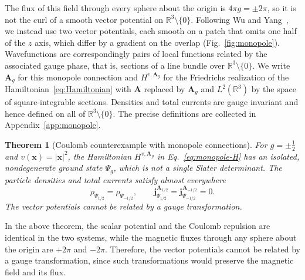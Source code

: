\documentclass[11pt,a4paper]{article}
\newtheorem{theorem}{Theorem}[section]
\theoremstyle{remark}
\theoremstyle{plain}
\newcommand{\R}{\mathbb R}
\newcommand{\jj}{\mathbf j}
\newcommand{\A}{\mathbf A}
\begin{document}
The flux of this field through every sphere about the origin
is $4\pi g=\pm2\pi$, so it is not the curl of a smooth vector potential
on $\R^3\setminus\{0\}$. Following Wu and Yang~\cite{WuYang1976}, we
instead use two vector potentials, each smooth on a patch that omits
one half of the $z$ axis, which differ by a gradient on the overlap
(Fig.~\ref{fig:monopole}). Wavefunctions are correspondingly pairs of
local functions related by the associated gauge phase, that is,
sections of a line bundle over $\R^3\setminus\{0\}$. We write $\A_g$
for this monopole connection and $H^{v,\A_g}$ for the Friedrichs
realization of the Hamiltonian~\eqref{eq:Hamiltonian} with $\A$
replaced by $\A_g$ and $L^2(\R^3)$ by the space of square-integrable
sections. Densities and total currents are gauge invariant and hence
defined on all of $\R^3\setminus\{0\}$. The precise definitions are
collected in Appendix~\ref{app:monopole}.

\begin{theorem}[Coulomb counterexample with monopole connections]
\label{thm:monopole}
For $g=\pm\tfrac12$ and $v(\mathbf x)=|\mathbf x|^2$, the Hamiltonian $H^{v,\A_g}$ in
Eq.~\eqref{eq:monopole-H} has an isolated, nondegenerate ground state
$\Psi_g$, which is not a single Slater determinant. The particle densities and total currents satisfy 
almost everywhere
\begin{equation}
 \rho_{\Psi_{1/2}}=\rho_{\Psi_{-1/2}},\qquad
 \jj_{\Psi_{1/2}}^{\A_{1/2}}=\jj_{\Psi_{-1/2}}^{\A_{-1/2}}=0.
 \label{eq:monopole-coincidence}
\end{equation}
The vector potentials cannot be related by a gauge transformation.
\end{theorem}


In the above theorem, the scalar potential and the Coulomb 
repulsion are identical in the
two systems, while the magnetic fluxes through any sphere about the
origin are $+2\pi$ and $-2\pi$. Therefore, the vector 
potentials cannot be related by a gauge transformation,
since such transformations would preserve the magnetic field and its flux.
\end{document}
